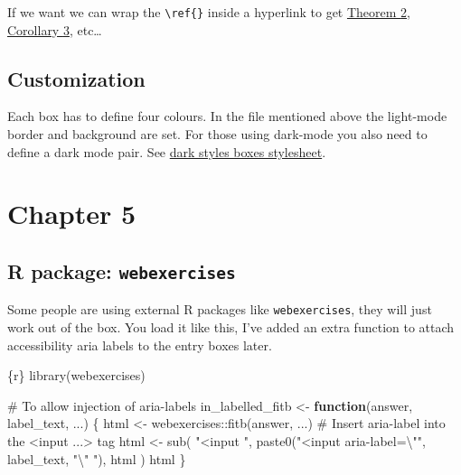 \documentclass[
  a4paper,
  DIV=11,
  numbers=noendperiod,
  oneside]{scrreport}
\newenvironment{Shaded}{\begin{snugshade}}{\end{snugshade}}
\newcommand{\CommentTok}[1]{\textcolor[rgb]{0.37,0.37,0.37}{#1}}
\newcommand{\ControlFlowTok}[1]{\textcolor[rgb]{0.00,0.23,0.31}{\textbf{#1}}}
\newcommand{\FunctionTok}[1]{\textcolor[rgb]{0.28,0.35,0.67}{#1}}
\newcommand{\InformationTok}[1]{\textcolor[rgb]{0.37,0.37,0.37}{#1}}
\newcommand{\NormalTok}[1]{\textcolor[rgb]{0.00,0.23,0.31}{#1}}
\newcommand{\OtherTok}[1]{\textcolor[rgb]{0.00,0.23,0.31}{#1}}
\newcommand{\SpecialCharTok}[1]{\textcolor[rgb]{0.37,0.37,0.37}{#1}}
\newcommand{\StringTok}[1]{\textcolor[rgb]{0.13,0.47,0.30}{#1}}
\begin{document}
If we want we can wrap the \texttt{\textbackslash{}ref\{\}} inside a
hyperlink to get \hyperref[rthmpythag]{Theorem
\hyperref[rthmpythag]{2}}, \hyperref[Rcor-pythag]{Corollary
\hyperref[Rcor-pythag]{3}}, etc\ldots{}

\section{Customization}\label{customization}

Each box has to define four colours. In the file mentioned above the
light-mode border and background are set. For those using dark-mode you
also need to define a dark mode pair. See
\href{../themes/dark-styles-boxes.scss}{dark styles boxes stylesheet}.


\chapter{Chapter 5}\label{chapter-5}

\section{\texorpdfstring{R package:
\texttt{webexercises}}{R package: webexercises}}\label{r-package-webexercises}

Some people are using external R packages like \texttt{webexercises},
they will just work out of the box. You load it like this, I've added an
extra function to attach accessibility aria labels to the entry boxes
later.

\begin{Shaded}
\begin{Highlighting}[]
\InformationTok{\textasciigrave{}\textasciigrave{}\textasciigrave{}\{r\}}
\FunctionTok{library}\NormalTok{(webexercises)}

\CommentTok{\# To allow injection of aria{-}labels}
\NormalTok{in\_labelled\_fitb }\OtherTok{\textless{}{-}} \ControlFlowTok{function}\NormalTok{(answer, label\_text, ...) \{}
\NormalTok{  html }\OtherTok{\textless{}{-}}\NormalTok{ webexercises}\SpecialCharTok{::}\FunctionTok{fitb}\NormalTok{(answer, ...)}
  \CommentTok{\# Insert aria{-}label into the \textless{}input ...\textgreater{} tag}
\NormalTok{  html }\OtherTok{\textless{}{-}} \FunctionTok{sub}\NormalTok{(}
    \StringTok{"\textless{}input "}\NormalTok{,}
    \FunctionTok{paste0}\NormalTok{(}\StringTok{"\textless{}input aria{-}label=}\SpecialCharTok{\textbackslash{}"}\StringTok{"}\NormalTok{, label\_text, }\StringTok{"}\SpecialCharTok{\textbackslash{}"}\StringTok{ "}\NormalTok{),}
\NormalTok{    html}
\NormalTok{  )}
\NormalTok{  html}
\NormalTok{\}}
\InformationTok{\textasciigrave{}\textasciigrave{}\textasciigrave{}}
\end{Highlighting}
\end{Shaded}
\end{document}
